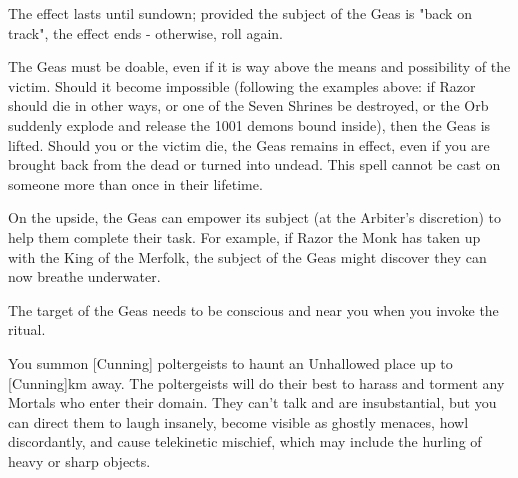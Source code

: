 {

The effect lasts until sundown; provided the subject of the Geas is "back on track", the effect ends - otherwise, roll again.

The Geas must be doable, even if it is way above the means and possibility of the victim.  Should it become impossible (following the examples above: if Razor should die in other ways, or one of the Seven Shrines be destroyed, or the Orb suddenly explode and release the 1001 demons bound inside), then the Geas is lifted.  Should you or the victim die, the Geas remains in effect, even if you are brought back from the dead or turned into undead. This spell cannot be cast on someone more than once in their lifetime.

On the upside, the Geas can empower its subject (at the Arbiter's discretion) to help them complete their task.  For example, if Razor the Monk has taken up with the King of the Merfolk, the subject of the Geas might discover they can now breathe underwater.

The target of the Geas needs to be conscious and near you when you invoke the ritual.

\OCCULT[
  Name=Haunt,
  Link=occultism-haunt,
  Success=3+,
  Cost=666\FE
]


You summon [Cunning] poltergeists to haunt an Unhallowed place up to [Cunning]km away.  The poltergeists will do their best to harass and torment any Mortals who enter their domain. They can't talk and are insubstantial, but you can direct them to laugh insanely, become visible as ghostly menaces, howl discordantly, and cause telekinetic mischief, which may include the hurling of heavy or sharp objects.

}
